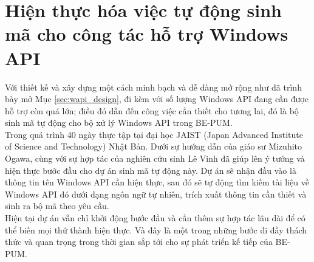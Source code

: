 \section{Hiện thực hóa việc tự động sinh mã cho công tác hỗ trợ Windows API}

Với thiết kế và xây dựng một cách minh bạch và dễ dàng mở rộng như đã trình bày mở Mục \ref{sec:wapi_design}, đi kèm với số lượng Windows API đang cần được hỗ trợ còn quá lớn; điều đó dẫn đến công việc cần thiết cho tương lai, đó là bộ sinh mã tự động cho bộ xử lý Windows API trong BE-PUM.\\

Trong quá trình 40 ngày thực tập tại đại học JAIST (Japan Advanced Institute of Science and Technology) Nhật Bản. Dưới sự hướng dẫn của giáo sư Mizuhito Ogawa, cùng với sự hợp tác của nghiên cứu sinh Lê Vinh đã giúp lên ý tưởng và hiện thực bước đầu cho dự án sinh mã tự động này. Dự án sẽ nhận đầu vào là thông tin tên Windows API cần hiện thực, sau đó sẽ tự động tìm kiếm tài liệu về Windows API đó dưới dạng ngôn ngữ tự nhiên, trích xuất thông tin cần thiết và sinh ra bộ mã theo yêu cầu.\\

Hiện tại dự án vẫn chỉ khởi động bước đầu và cần thêm sự hợp tác lâu dài để có thể biến mọi thứ thành hiện thực. Và đây là một trong những bước đi đầy thách thức và quan trọng trong thời gian sắp tới cho sự phát triển kế tiếp của BE-PUM.
